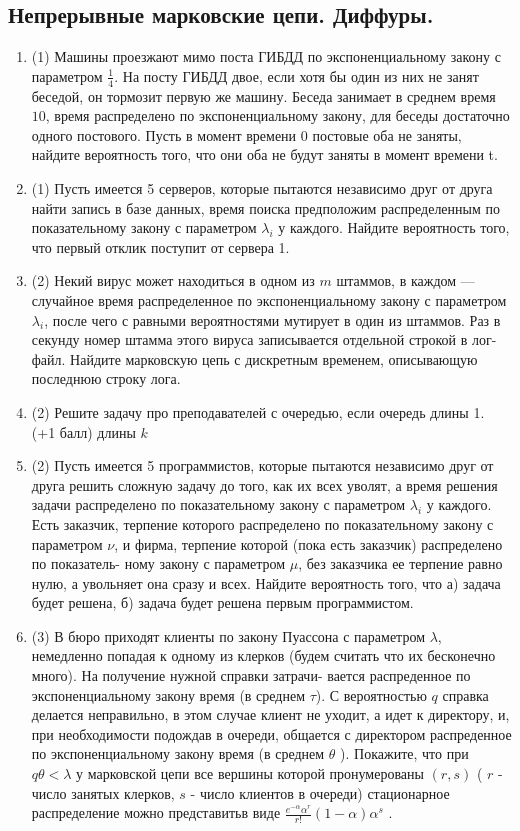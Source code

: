 \documentclass[a4paper, 14pt]{extarticle}
\begin{document}
\subsection*{Непрерывные марковские цепи. Диффуры.}
\begin{enumerate}
\item (1) Машины проезжают мимо поста ГИБДД по экспоненциальному закону с параметром $\frac{1}{4}$. На посту ГИБДД двое, если хотя бы один из них не занят беседой, он тормозит первую же машину. Беседа занимает в среднем время $10$, время распределено по экспоненциальному закону, для беседы достаточно одного постового. Пусть в момент времени 0 постовые оба не заняты, найдите вероятность того, что они оба не будут заняты в момент времени t.
\item (1) Пусть имеется 5 серверов, которые пытаются независимо друг от друга найти запись в базе данных, время поиска предположим распределенным по показательному закону с параметром $\lambda_i$ у каждого. Найдите вероятность того, что первый отклик поступит от сервера 1.
\item (2) Некий вирус может находиться в одном из $m$ штаммов, в каждом — случайное время распределенное по экспоненциальному закону с параметром $\lambda_i$, после чего с равными вероятностями мутирует в один из штаммов. Раз в секунду номер штамма этого вируса записывается отдельной строкой в лог-файл. Найдите марковскую цепь с дискретным временем, описывающую последнюю строку лога.
\item (2) Решите задачу про преподавателей с очередью, если очередь длины 1. (+1 балл) длины $k$
\item (2) Пусть имеется 5 программистов, которые пытаются независимо друг от друга решить
сложную задачу до того, как их всех уволят, а время решения задачи распределено по показательному
закону с параметром $\lambda_i$ у каждого. Есть заказчик, терпение которого распределено по показательному
закону с параметром $\nu$, и фирма, терпение которой (пока есть заказчик) распределено по показатель-
ному закону с параметром $\mu$, без заказчика ее терпение равно нулю, а увольняет она сразу и всех.
Найдите вероятность того, что а) задача будет решена, б) задача будет решена первым программистом.
\item (3) В бюро приходят клиенты по закону Пуассона с параметром $\lambda$, немедленно попадая к
одному из клерков (будем считать что их бесконечно много). На получение нужной справки затрачи-
вается распреденное по экспоненциальному закону время (в среднем $\tau$). С вероятностью $q$ справка
делается неправильно, в этом случае клиент не уходит, а идет к директору, и, при необходимости подождав
 в очереди, общается с директором распреденное по экспоненциальному закону время (в среднем
$\theta$ ). Покажите, что при $q\theta < \lambda$ у марковской цепи все вершины которой пронумерованы $(r, s)$ ( $r$ - число
 занятых клерков, $s$ - число клиентов в очереди) стационарное распределение можно представитьв виде $\frac{e^{-\alpha}\alpha^r}{r!}(1-\alpha)\alpha^s$ .
\end{enumerate}
\end{document}
